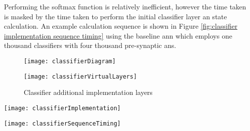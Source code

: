 Performing the softmax function is relatively inefficient, however the time taken is masked by the time taken to perform the initial classifier layer \ac{an} state calculation.
An example calculation sequence is shown in Figure \ref{fig:classifier implementation sequence timing} using the baseline \ac{ann} which employs one thousand classifiers with four thousand pre-synaptic \acp{an}.
\begin{figure}[h]
  \vspace{-5mm}
  \centering
  \captionsetup{justification=centering}
  \captionsetup{width=0.9\textwidth}
  \begin{minipage}{1\textwidth}
    \centering
    \centerline{
    \mbox{\texttt{[image: classifierDiagram]}}
    }
    \center\caption{Classifier layer}
    \label{fig:classifier layer}
  \end{minipage}
  \bigskip
  \vspace{-1mm}
  \begin{minipage}{1\textwidth}
    \centering
    \centerline{
    \mbox{\texttt{[image: classifierVirtualLayers]}}
    }
    \caption{Classifier additional implementation layers}
    \label{fig:classifier additional layers}
  \end{minipage}
\end{figure}
\begin{sidewaysfigure}[h]
  \centering
  \captionsetup{justification=centering}
  \captionsetup{width=0.9\textwidth}
  \begin{minipage}{1\textwidth}
    \centering
    \centerline{
    \mbox{\texttt{[image: classifierImplementation]}}
    }
    \caption{Classifier layer stOp/SIMD implementation}
    \label{fig:classifier implementation}
  \end{minipage}
  \bigskip
  \vspace{1mm}
  \begin{minipage}{1\textwidth}
    \centering
    \centerline{
    \mbox{\texttt{[image: classifierSequenceTiming]}}
    }
    \center\caption{Classifier layer stOp/SIMD sequence timing}
    \label{fig:classifier implementation sequence timing}
  \end{minipage}
\end{sidewaysfigure}

